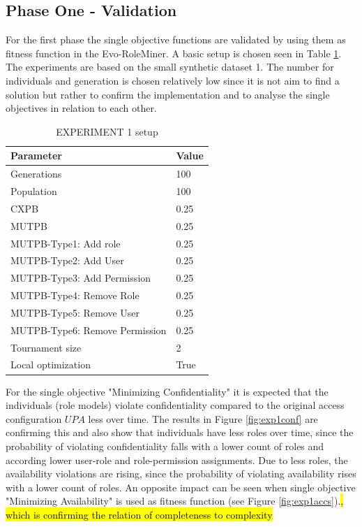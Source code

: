 \subsection{Phase One - Validation}
\label{sec:phase1}
For the first phase the single objective functions are validated by using them as fitness function in the Evo-RoleMiner. A basic setup is chosen seen in Table \ref{tab:setup1}. The experiments are based on the small synthetic dataset 1. The number for individuals and generation is chosen relatively low since it is not aim to find a solution but rather to confirm the implementation and to analyse the single objectives in relation to each other. \\
\begin{table}[H]
    \centering
    \begin{tabular}{|l|l|}
        \hline
        \rowcolor{gray!25} 
        \textbf{Parameter}              & \textbf{Value}    \\ \hline
        Generations                     & 100              \\ \hline
        Population                      & 100              \\ \hline
        CXPB                            & 0.25              \\ \hline
        MUTPB                           & 0.25              \\ \hline
        MUTPB-Type1: Add role           & 0.25              \\ \hline
        MUTPB-Type2: Add User           & 0.25              \\ \hline
        MUTPB-Type3: Add Permission     & 0.25              \\ \hline
        MUTPB-Type4: Remove Role        & 0.25              \\ \hline
        MUTPB-Type5: Remove User        & 0.25              \\ \hline
        MUTPB-Type6: Remove Permission  & 0.25              \\ \hline
        Tournament size                 & 2                 \\ \hline
        Local optimization              & True              \\ \hline
    \end{tabular}
    \caption{EXPERIMENT 1 setup}
    \label{tab:setup1}
\end{table}
For the single objective "Minimizing Confidentiality" it is expected that the individuals (role models) violate confidentiality compared to the original access configuration $UPA$ less over time. The results in Figure \ref{fig:exp1conf} are confirming this and also show that individuals have less roles over time, since the probability of violating confidentiality falls with a lower count of roles and according lower user-role and role-permission assignments. Due to less roles, the availability violations are rising, since the probability of violating availability rises with a lower count of roles. An opposite impact can be seen when single objective "Minimizing Availability" is used as fitness function (see Figure \ref{fig:exp1accs}).\hl{, which is confirming the relation of completeness to complexity}\\

